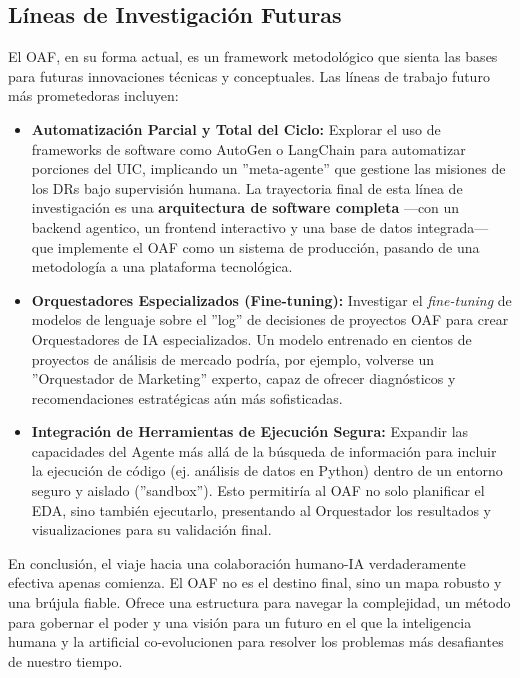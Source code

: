 \documentclass[11pt, a4paper]{article}
\begin{document}
\subsection{Líneas de Investigación Futuras}
El OAF, en su forma actual, es un framework metodológico que sienta las bases para futuras innovaciones técnicas y conceptuales. Las líneas de trabajo futuro más prometedoras incluyen:
\begin{itemize}
    \item \textbf{Automatización Parcial y Total del Ciclo:} Explorar el uso de frameworks de software como AutoGen o LangChain para automatizar porciones del UIC, implicando un ''meta-agente'' que gestione las misiones de los DRs bajo supervisión humana. La trayectoria final de esta línea de investigación es una \textbf{arquitectura de software completa} —con un backend agentico, un frontend interactivo y una base de datos integrada— que implemente el OAF como un sistema de producción, pasando de una metodología a una plataforma tecnológica.
    
    \item \textbf{Orquestadores Especializados (Fine-tuning):} Investigar el \textit{fine-tuning} de modelos de lenguaje sobre el ''log'' de decisiones de proyectos OAF para crear Orquestadores de IA especializados. Un modelo entrenado en cientos de proyectos de análisis de mercado podría, por ejemplo, volverse un ''Orquestador de Marketing'' experto, capaz de ofrecer diagnósticos y recomendaciones estratégicas aún más sofisticadas.
    
    \item \textbf{Integración de Herramientas de Ejecución Segura:} Expandir las capacidades del Agente más allá de la búsqueda de información para incluir la ejecución de código (ej. análisis de datos en Python) dentro de un entorno seguro y aislado (''sandbox''). Esto permitiría al OAF no solo planificar el EDA, sino también ejecutarlo, presentando al Orquestador los resultados y visualizaciones para su validación final.
\end{itemize}

En conclusión, el viaje hacia una colaboración humano-IA verdaderamente efectiva apenas comienza. El OAF no es el destino final, sino un mapa robusto y una brújula fiable. Ofrece una estructura para navegar la complejidad, un método para gobernar el poder y una visión para un futuro en el que la inteligencia humana y la artificial co-evolucionen para resolver los problemas más desafiantes de nuestro tiempo.
\end{document}
